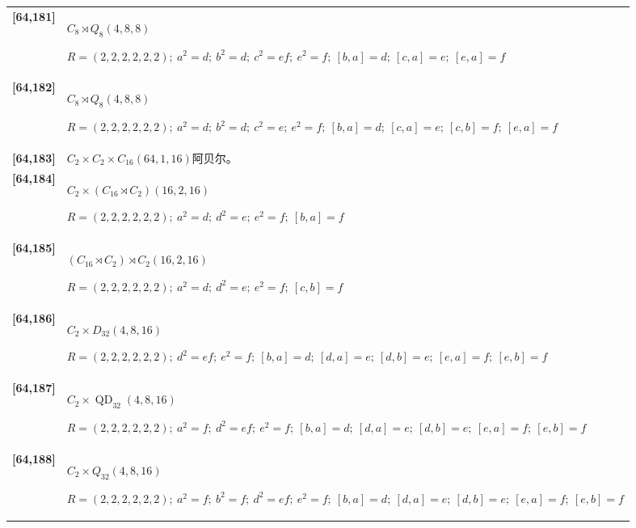 \documentclass[UTF8,fontset=fandol,11pt,a4paper]{ctexart}
\begin{document}
\begin{longtable}{@{}p{17mm}>{\raggedright\arraybackslash}p{141mm}@{}}
\textbf{[64,181]} & $C_{8}\rtimes Q_{8}$\quad $(4,8,8)$\par\(R=(2,2,2,2,2,2);\allowbreak\ a^{2}=d;\allowbreak\ b^{2}=d;\allowbreak\ c^{2}=ef;\allowbreak\ e^{2}=f;\allowbreak\ [b,a]=d;\allowbreak\ [c,a]=e;\allowbreak\ [e,a]=f\)\\[3pt]

\textbf{[64,182]} & $C_{8}\rtimes Q_{8}$\quad $(4,8,8)$\par\(R=(2,2,2,2,2,2);\allowbreak\ a^{2}=d;\allowbreak\ b^{2}=d;\allowbreak\ c^{2}=e;\allowbreak\ e^{2}=f;\allowbreak\ [b,a]=d;\allowbreak\ [c,a]=e;\allowbreak\ [c,b]=f;\allowbreak\ [e,a]=f\)\\[3pt]

\textbf{[64,183]} & $C_{2}\times C_{2}\times C_{16}$\quad $(64,1,16)$\quad 阿贝尔。\\[3pt]

\textbf{[64,184]} & $C_{2}\times (C_{16}\rtimes C_{2})$\quad $(16,2,16)$\par\(R=(2,2,2,2,2,2);\allowbreak\ a^{2}=d;\allowbreak\ d^{2}=e;\allowbreak\ e^{2}=f;\allowbreak\ [b,a]=f\)\\[3pt]

\textbf{[64,185]} & $(C_{16}\rtimes C_{2})\rtimes C_{2}$\quad $(16,2,16)$\par\(R=(2,2,2,2,2,2);\allowbreak\ a^{2}=d;\allowbreak\ d^{2}=e;\allowbreak\ e^{2}=f;\allowbreak\ [c,b]=f\)\\[3pt]

\textbf{[64,186]} & $C_{2}\times D_{32}$\quad $(4,8,16)$\par\(R=(2,2,2,2,2,2);\allowbreak\ d^{2}=ef;\allowbreak\ e^{2}=f;\allowbreak\ [b,a]=d;\allowbreak\ [d,a]=e;\allowbreak\ [d,b]=e;\allowbreak\ [e,a]=f;\allowbreak\ [e,b]=f\)\\[3pt]

\textbf{[64,187]} & $C_{2}\times \operatorname{QD}_{32}$\quad $(4,8,16)$\par\(R=(2,2,2,2,2,2);\allowbreak\ a^{2}=f;\allowbreak\ d^{2}=ef;\allowbreak\ e^{2}=f;\allowbreak\ [b,a]=d;\allowbreak\ [d,a]=e;\allowbreak\ [d,b]=e;\allowbreak\ [e,a]=f;\allowbreak\ [e,b]=f\)\\[3pt]

\textbf{[64,188]} & $C_{2}\times Q_{32}$\quad $(4,8,16)$\par\(R=(2,2,2,2,2,2);\allowbreak\ a^{2}=f;\allowbreak\ b^{2}=f;\allowbreak\ d^{2}=ef;\allowbreak\ e^{2}=f;\allowbreak\ [b,a]=d;\allowbreak\ [d,a]=e;\allowbreak\ [d,b]=e;\allowbreak\ [e,a]=f;\allowbreak\ [e,b]=f\)\\[3pt]


\end{longtable}
\end{document}
